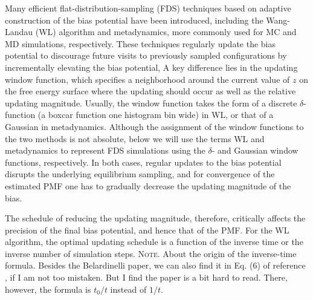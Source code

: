 \documentclass[reprint, superscriptaddress, floatfix]{revtex4-1}
\newcommand{\note}[1]{{\color{DarkGreen}\footnotesize \textsc{Note.} #1}}
\begin{document}
Many efficient flat-distribution-sampling (FDS) techniques
based on adaptive construction of the bias potential
have been introduced,
including the Wang-Landau (WL) algorithm\cite{
  wang2001, *wang2001pre}
and metadynamics\cite{huber1994,
*laio2002, *laio2008, *barducci2011, *sutto2012},
more commonly used for MC and MD simulations, respectively\cite{junghans2014}.
%
%
These techniques regularly update the bias potential
to discourage future visits to previously sampled configurations
by incrementally elevating the bias potential,
%
%
A key difference lies
in the updating window function,
which specifies
a neighborhood around the current value of $z$ on the free energy surface
where the updating should occur
as well as the relative updating magnitude.
%
Usually, the window function
takes the form of a discrete
$\delta$-function (a boxcar function one histogram bin wide)
in WL,
or that of a Gaussian
in metadynamics.
%
Although the assignment of the window functions to the two methods
is not absolute\cite{micheletti2004, kim2006, *kim2007, junghans2014},
below we will use the terms WL and metadynamics
to represent FDS simulations using the
$\delta$- and Gaussian window functions, respectively.
%
%
In both cases,
regular updates to the bias potential
disrupts the underlying equilibrium
sampling\cite{zhou2005, morozov2007, zhou2008},
and for convergence of the estimated PMF
one  has to gradually decrease
the updating magnitude of the bias.



The schedule of reducing
the updating magnitude,
therefore, critically affects
the precision of the final bias potential,
and hence that of the PMF\cite{
belardinelli2007, *belardinelli2007jcp, *belardinelli2008, *belardinelli2016,
liang2007,
morozov2007, zhou2008,
komura2012, *caparica2012, *caparica2014,
barducci2008, dickson2011, dama2014}.
%
For the WL algorithm, the optimal updating schedule
is a function of the
inverse time\cite{
belardinelli2007, *belardinelli2007jcp, *belardinelli2008, *belardinelli2016,
liang2007,
morozov2007, zhou2008}
or
the inverse number of simulation steps.
\note{
  About the origin of the inverse-time formula.
  Besides the Belardinelli paper,
  we can also find it in Eq. (6) of reference \cite{liang2007},
  if I am not too mistaken.
  But I find the paper is a bit hard to read.
  There, however, the formula is $t_0/t$ instead of $1/t$.
}
%
\end{document}
